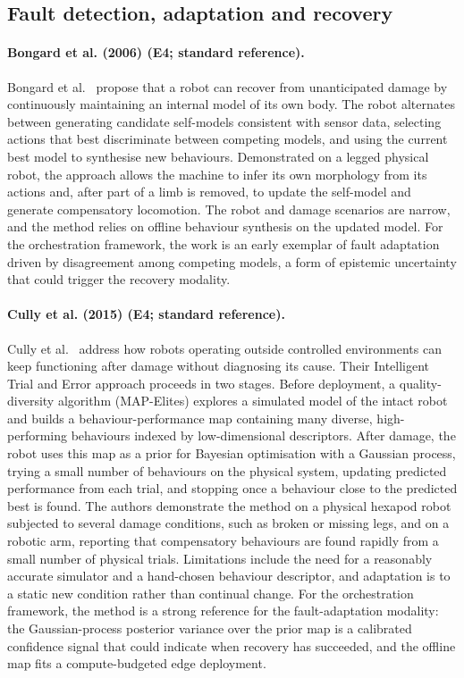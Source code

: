 \documentclass[10pt,a4paper]{article}
\begin{document}
\subsection*{Fault detection, adaptation and recovery}
\paragraph{Bongard et al. (2006) (E4; standard reference).} Bongard et al.~\cite{Bongard2006} propose that a robot can recover from unanticipated damage by continuously maintaining an internal model of its own body. The robot alternates between generating candidate self-models consistent with sensor data, selecting actions that best discriminate between competing models, and using the current best model to synthesise new behaviours. Demonstrated on a legged physical robot, the approach allows the machine to infer its own morphology from its actions and, after part of a limb is removed, to update the self-model and generate compensatory locomotion. The robot and damage scenarios are narrow, and the method relies on offline behaviour synthesis on the updated model. For the orchestration framework, the work is an early exemplar of fault adaptation driven by disagreement among competing models, a form of epistemic uncertainty that could trigger the recovery modality.

\paragraph{Cully et al. (2015) (E4; standard reference).} Cully et al.~\cite{Cully2015} address how robots operating outside controlled environments can keep functioning after damage without diagnosing its cause. Their Intelligent Trial and Error approach proceeds in two stages. Before deployment, a quality-diversity algorithm (MAP-Elites) explores a simulated model of the intact robot and builds a behaviour-performance map containing many diverse, high-performing behaviours indexed by low-dimensional descriptors. After damage, the robot uses this map as a prior for Bayesian optimisation with a Gaussian process, trying a small number of behaviours on the physical system, updating predicted performance from each trial, and stopping once a behaviour close to the predicted best is found. The authors demonstrate the method on a physical hexapod robot subjected to several damage conditions, such as broken or missing legs, and on a robotic arm, reporting that compensatory behaviours are found rapidly from a small number of physical trials. Limitations include the need for a reasonably accurate simulator and a hand-chosen behaviour descriptor, and adaptation is to a static new condition rather than continual change. For the orchestration framework, the method is a strong reference for the fault-adaptation modality: the Gaussian-process posterior variance over the prior map is a calibrated confidence signal that could indicate when recovery has succeeded, and the offline map fits a compute-budgeted edge deployment.
\end{document}
